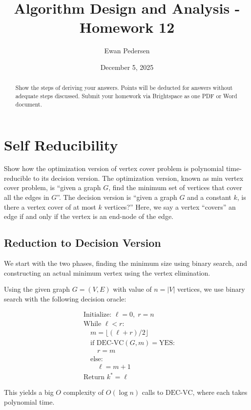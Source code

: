 \documentclass[12pt]{article}
\title{Algorithm Design and Analysis - Homework 12}
\author{Ewan Pedersen}
\date{December 5, 2025}
\begin{document}
\maketitle

\begin{abstract}
Show the steps of deriving your answers. Points will be deducted for answers without adequate steps discussed. Submit your homework via Brightspace as one PDF or Word document.
\end{abstract}

\section{Self Reducibility}

Show how the optimization version of vertex cover problem is polynomial time-reducible to its decision version. The optimization version, known as min vertex cover problem, is ``given a graph $G$, find the minimum set of vertices that cover all the edges in $G$''. The decision version is ``given a graph $G$ and a constant $k$, is there a vertex cover of at most $k$ vertices?'' Here, we say a vertex ``covers'' an edge if and only if the vertex is an end-node of the edge.

\subsection{Reduction to Decision Version}

We start with the two phases, finding the minimum size using binary search, and constructing an actual minimum vertex using the vertex elimination.

Using the given graph $G=(V,E)$ with value of $n=|V|$ vertices, we use binary search with the following decision oracle:

\begin{align}
&\text{Initialize: } \ell = 0, \; r = n\\
&\text{While } \ell < r:\\
&\quad m = \lfloor (\ell + r) / 2 \rfloor\\
&\quad \text{if DEC-VC}(G, m) = \text{YES}:\\
&\quad\quad r = m\\
&\quad \text{else}:\\
&\quad\quad \ell = m + 1\\
&\text{Return } k^* = \ell
\end{align}

This yields a big $O$ complexity of $O(\log n)$ calls to $\text{DEC-VC}$, where each takes polynomial time.
\end{document}
